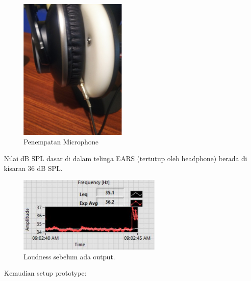 \documentclass[12pt,]{article}
\begin{document}
	\begin{figure}[!ht]
		\centering
		\includegraphics[width=150pt]{images/ukur_mic}
		\caption{Penempatan Microphone}
	\end{figure}

	Nilai dB SPL dasar di dalam telinga EARS (tertutup oleh headphone) berada di kisaran 36 dB SPL.
	
	\begin{figure}[!ht]
		\centering
		\includegraphics[width=200pt]{images/eli0}
		\caption{Loudness sebelum ada output.}
	\end{figure}
	
	Kemudian setup prototype:
	
\end{document}
